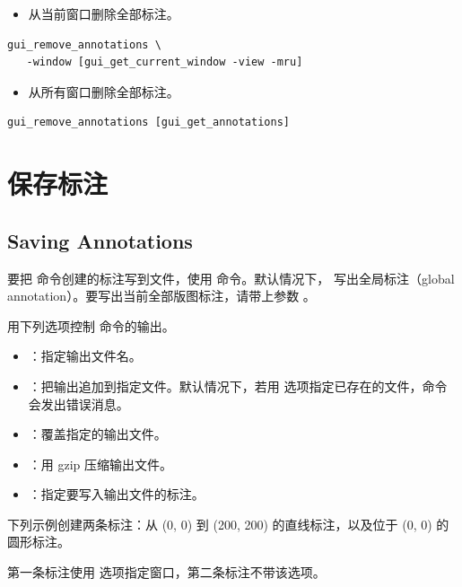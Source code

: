 \begin{itemize}
  \item 从当前窗口删除全部标注。
\end{itemize}

\begin{lstlisting}
gui_remove_annotations \
   -window [gui_get_current_window -view -mru]
\end{lstlisting}

\begin{itemize}
  \item 从所有窗口删除全部标注。
\end{itemize}

\begin{lstlisting}
gui_remove_annotations [gui_get_annotations]
\end{lstlisting}

\section{保存标注}
\subsection*{Saving Annotations}

要把  命令创建的标注写到文件，使用  命令。默认情况下， 写出全局标注（global annotation）。要写出当前全部版图标注，请带上参数 。

用下列选项控制  命令的输出。
\begin{itemize}
  \item {} ：指定输出文件名。
  \item {}：把输出追加到指定文件。默认情况下，若用  选项指定已存在的文件，命令会发出错误消息。
  \item \opt{-force}：覆盖指定的输出文件。
  \item {} ：用 gzip 压缩输出文件。
  \item {}：指定要写入输出文件的标注。
\end{itemize}

下列示例创建两条标注：从 (0, 0) 到 (200, 200) 的直线标注，以及位于 (0, 0) 的圆形标注。

\begin{noteBox}
第一条标注使用  选项指定窗口，第二条标注不带该选项。
\end{noteBox}

